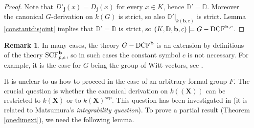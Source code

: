 \documentclass[10pt]{amsart}
\DeclareMathOperator{\sep}{sep}\DeclareMathOperator{\tw}{tw}\DeclareMathOperator{\ord}{ord}\DeclareMathOperator{\ffix}{Fix}
\newtheorem{theorem}{Theorem}[section]
\theoremstyle{definition}
\newtheorem{remark}[theorem]{Remark}
\begin{document}
\begin{proof}
 Note that $D'_{\mathbf{j}}(x)=D_{\mathbf{j}}(x)$ for every $x\in K$, hence $\mathbb{D}'=\mathbb{D}$.
 Moreover the canonical $G$-derivation on $k(G)$ is strict, so also $\mathbb{D}'|_{k(\mathbf{b},c)}$ is strict.
 Lemma \ref{constantdisjoint} implies that $\mathbb{D}'=\mathbb{D}$ is strict, so $(K,\mathbb{D},\mathbf{b},c)\models G-\operatorname{DCF}^{{\mathbf{b}},c}$.
\end{proof}
\noindent
\begin{remark}
In many cases, the theory $G-\operatorname{DCF}^{\mathbf{b}}$ is an extension by definitions of the theory $\operatorname{SCF}^{{\mathbf{b}}}_{p,e}$, so in such cases the constant symbol $c$ is not necessary. For example, it is the case for $G$ being the group of Witt vectors, see \cite{Hoff2}.
\end{remark}
It is unclear to us how to proceed in the case of an arbitrary formal group $F$. The crucial question is whether the canonical derivation on $k((\mathbf{X}))$ can be restricted to $k(\mathbf{X})$ or to $k(\mathbf{X})^{\sep}$. This question has been investigated in \cite{HK2} (it is related to Matsumura's \emph{integrability question}). To prove a partial result (Theorem \ref{onedimext}), we need the following lemma.
\end{document}
